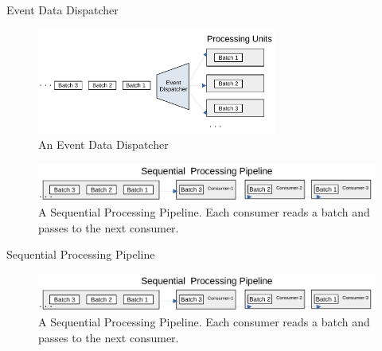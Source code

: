 \documentclass[9pt]{beamer}
\begin{document}
\begin{frame}[fragile]{Event Data Dispatcher  }

        \begin{figure}
            \begin{center}
                \includegraphics[width=0.7\textwidth]{../paper/images/Stream-Batch-Distributions}
                \caption{An Event Data Dispatcher}
                \label{fig:batch-distributions}
            \end{center}
        \end{figure}
     
        \begin{figure}
            \begin{center}
                \includegraphics[width=1\textwidth]{../paper/images/Stream-Batch-Distributions_op2}
                \caption{A Sequential Processing Pipeline. Each consumer reads a batch and passes to the next consumer.}
                \label{fig:Sequential-batch-distributions}
            \end{center}
        \end{figure}

\end{frame}









\begin{frame}[fragile]{ Sequential Processing Pipeline }
    

 
    \begin{figure}
        \begin{center}
            \includegraphics[width=1\textwidth]{../paper/images/Stream-Batch-Distributions_op2}
            \caption{A Sequential Processing Pipeline. Each consumer reads a batch and passes to the next consumer.}
            \label{fig:Sequential-batch-distributions}
        \end{center}
    \end{figure}


\end{frame}
\end{document}

